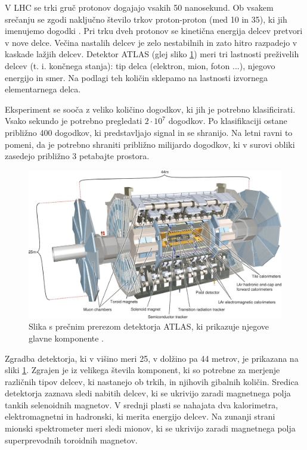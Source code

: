 \documentclass[11pt,a4paper,openany]{book}
\begin{document}
V LHC se trki gruč protonov dogajajo vsakih 50 nanosekund. Ob vsakem srečanju se zgodi naključno število trkov proton-proton (med 10 in 35), ki jih imenujemo dogodki \cite{ChallengeDoc}. Pri trku dveh protonov se kinetična energija delcev pretvori v nove delce. Večina nastalih delcev je zelo nestabilnih in zato hitro razpadejo v kaskade lažjih delcev. Detektor ATLAS (glej sliko \ref{detektoratlas}) meri tri lastnosti preživelih delcev (t. i. končnega stanja): tip delca (elektron, mion, foton ...), njegovo energijo in smer. Na podlagi teh količin sklepamo na lastnosti izvornega elementarnega delca.

Eksperiment se sooča z veliko količino dogodkov, ki jih je potrebno klasificirati. Vsako sekundo je potrebno pregledati $2 \cdot 10^7$ dogodkov. Po klasifikaciji ostane približno 400 dogodkov, ki predstavljajo signal in se shranijo. Na letni ravni to pomeni, da je potrebno shraniti približno milijardo dogodkov, ki v surovi obliki zasedejo približno 3 petabajte prostora.

\begin{figure}[ht]
	\includegraphics[width=16.0cm]{physics/atlas_detector.jpg}
	
	\caption{Slika s prečnim prerezom detektorja ATLAS, ki prikazuje njegove glavne komponente \cite{AadScience2012}.  }
	\label{detektoratlas}
\end{figure}

Zgradba detektorja, ki v višino meri 25, v dolžino pa 44 metrov, je prikazana na sliki \ref{detektoratlas}. Zgrajen je iz velikega števila komponent, ki so potrebne za merjenje različnih tipov delcev, ki nastanejo ob trkih, in njihovih gibalnih količin. Sredica detektorja zaznava sledi nabitih delcev, ki se ukrivijo zaradi magnetnega polja tankih selenoidnih magnetov. V srednji plasti se nahajata dva kalorimetra, elektromagnetni in hadronski, ki merita energijo delcev. Na zunanji strani mionski spektrometer meri sledi mionov, ki se ukrivijo zaradi magnetnega polja superprevodnih toroidnih magnetov.
\end{document}

